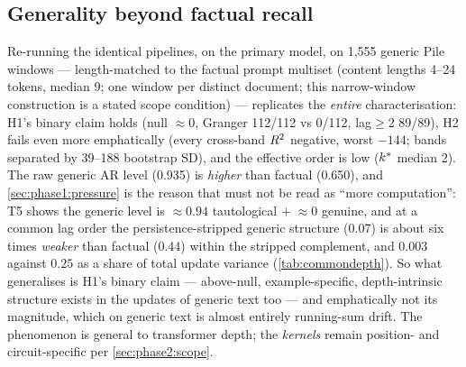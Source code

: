 \subsection{Generality beyond factual recall}
\label{sec:phase2:generic}

Re-running the identical pipelines, on the primary model, on 1{,}555 generic
Pile windows ---
length-matched to the factual prompt multiset (content lengths 4--24 tokens,
median 9; one window per distinct document; this narrow-window construction is
a stated scope condition) --- replicates the \emph{entire} characterisation:
H1's binary claim holds (null $\approx 0$, Granger 112/112 vs 0/112,
lag$\ge$2 89/89), H2 fails even more emphatically (every cross-band $R^2$
negative, worst $-144$; bands separated by 39--188 bootstrap SD), and the
effective order is low ($k^{\ast}$ median 2). The raw generic AR level (0.935)
is \emph{higher} than factual (0.650), and \cref{sec:phase1:pressure} is the
reason that must not be read as ``more computation'': T5 shows the generic
level is $\approx 0.94$ tautological $+\;{\approx}0$ genuine, and at a common
lag order the persistence-stripped generic structure (0.07) is about six
times \emph{weaker} than factual (0.44) within the stripped complement, and
$0.003$ against $0.25$ as a share of total update variance
(\cref{tab:commondepth}). So what generalises is H1's
binary claim --- above-null, example-specific, depth-intrinsic structure
exists in the updates of generic text too --- and emphatically not its
magnitude, which on generic text is almost entirely running-sum drift. The
phenomenon is general to transformer depth; the \emph{kernels}
remain position- and circuit-specific per \cref{sec:phase2:scope}.
